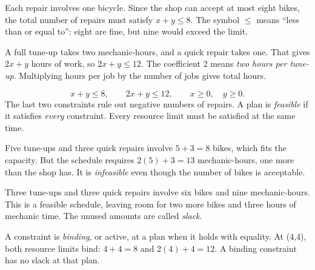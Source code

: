 \documentclass[11pt,letterpaper]{article}
\begin{document}
Each repair involves one bicycle. Since the shop can accept at most eight bikes, the total number of repairs must satisfy \(x+y\leq8\). The symbol \(\leq\) means ``less than or equal to'': eight are fine, but nine would exceed the limit.


A full tune-up takes two mechanic-hours, and a quick repair takes one. That gives \(2x+y\) hours of work, so \(2x+y\leq12\). The coefficient 2 means \emph{two hours per tune-up}. Multiplying hours per job by the number of jobs gives total hours.

\[x+y\leq8,\qquad 2x+y\leq12,\qquad x\geq0,\quad y\geq0.\]
The last two constraints rule out negative numbers of repairs. A plan is \emph{feasible} if it satisfies \emph{every} constraint. Every resource limit must be satisfied at the same time.


\begin{tcolorbox}[title={Example \textperiodcentered{} Test (5,3) and (3,3)},breakable]

Five tune-ups and three quick repairs involve \(5+3=8\) bikes, which fits the capacity. But the schedule requires \(2(5)+3=13\) mechanic-hours, one more than the shop has. It is \emph{infeasible} even though the number of bikes is acceptable.


Three tune-ups and three quick repairs involve six bikes and nine mechanic-hours. This is a feasible schedule, leaving room for two more bikes and three hours of mechanic time. The unused amounts are called \emph{slack}.


\end{tcolorbox}


\par{}\par\medskip


A constraint is \emph{binding}, or active, at a plan when it holds with equality. At (4,4), both resource limits bind: \(4+4=8\) and \(2(4)+4=12\). A binding constraint has no slack at that plan.
\end{document}

